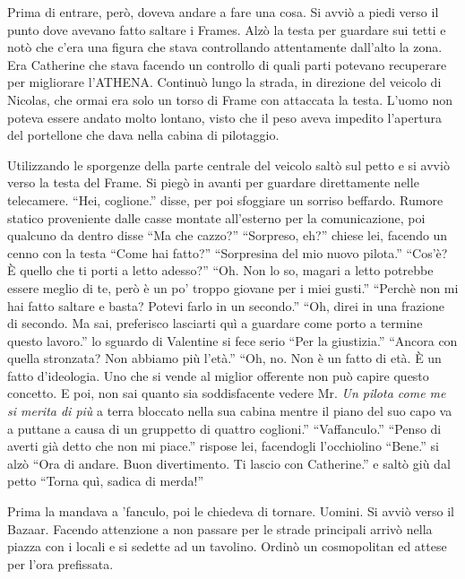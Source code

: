    Prima di entrare, però, doveva andare a fare una cosa. Si avviò a piedi verso il punto dove avevano fatto saltare i
    Frames. Alzò la testa per guardare sui tetti e notò che c'era una figura che stava controllando attentamente
    dall'alto la zona. Era Catherine che stava facendo un controllo di quali parti potevano recuperare per migliorare
    l'ATHENA. Continuò lungo la strada, in direzione del veicolo di Nicolas, che ormai era solo un torso di Frame con
    attaccata la testa. L'uomo non poteva essere andato molto lontano, visto che il peso aveva impedito l'apertura del
    portellone che dava nella cabina di pilotaggio.

    Utilizzando le sporgenze della parte centrale del veicolo saltò sul petto e si avviò verso la testa del Frame.
    Si piegò in avanti per guardare direttamente nelle telecamere. ``Hei, coglione.'' disse, per poi sfoggiare un
    sorriso beffardo. Rumore statico proveniente dalle casse montate all'esterno per la comunicazione, poi qualcuno da
    dentro disse ``Ma che cazzo?'' ``Sorpreso, eh?'' chiese lei, facendo un cenno con la testa ``Come hai fatto?''
    ``Sorpresina del mio nuovo pilota.'' ``Cos'è? È quello che ti porti a letto adesso?'' ``Oh. Non lo so, magari a
    letto potrebbe essere meglio di te, però è un po' troppo giovane per i miei gusti.'' ``Perchè non mi hai fatto
    saltare e basta? Potevi farlo in un secondo.'' ``Oh, direi in una frazione di secondo. Ma sai, preferisco lasciarti
    quì a guardare come porto a termine questo lavoro.'' lo sguardo di Valentine si fece serio ``Per la giustizia.''
    ``Ancora con quella stronzata? Non abbiamo più l'età.'' ``Oh, no. Non è un fatto di età. È un fatto d'ideologia. Uno
    che si vende al miglior offerente non può capire questo concetto. E poi, non sai quanto sia soddisfacente vedere Mr.
    \emph{Un pilota come me si merita di più} a terra bloccato nella sua cabina mentre il piano del suo capo va a
    puttane a causa di un gruppetto di quattro coglioni.'' ``Vaffanculo.'' ``Penso di averti già detto che non mi
    piace.'' rispose lei, facendogli l'occhiolino ``Bene.'' si alzò ``Ora di andare. Buon divertimento. Ti lascio con
    Catherine.'' e saltò giù dal petto ``Torna quì, sadica di merda!''

    Prima la mandava a 'fanculo, poi le chiedeva di tornare. Uomini. Si avviò verso il Bazaar. Facendo attenzione a non
    passare per le strade principali arrivò nella piazza con i locali e si sedette ad un tavolino. Ordinò un
    cosmopolitan ed attese per l'ora prefissata.

